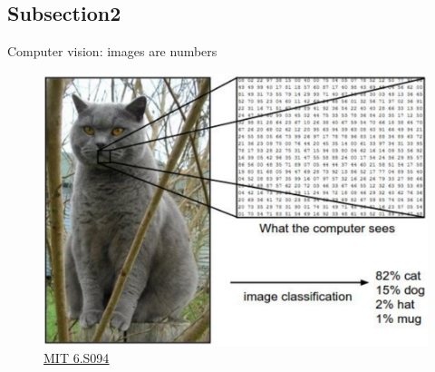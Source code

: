 \documentclass[10pt, xcolor=x11names,compress]{beamer}
\begin{document}
\subsection{Subsection2}
\begin{frame}{Computer vision: images are numbers}
\begin{figure}
	\centering
	\includegraphics[width=.8\textwidth]{images/cat_array.png}
	\caption{\href{https://deeplearning.mit.edu}{{\color{blue}\underline{MIT 6.S094}}}}
\end{figure}
\end{frame}
\end{document}
